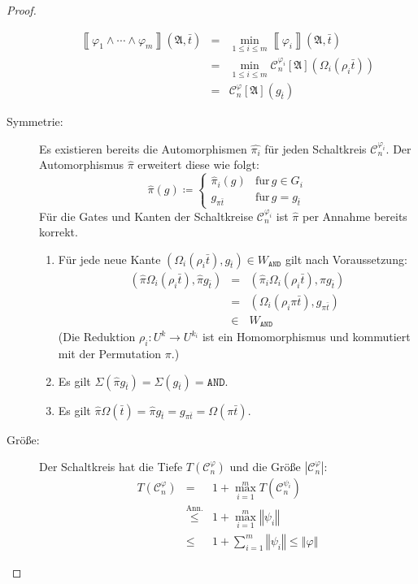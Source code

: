\begin{proof}
\begin{casenv}
\begin{description}
\begin{eqnarray*}
\left\llbracket \varphi_{1}\wedge\cdots\wedge\varphi_{m}\right\rrbracket \left(\mathfrak{A},\bar{t}\right) & = & \min_{1\leqslant i\leqslant m}\left\llbracket \varphi_{i}\right\rrbracket \left(\mathfrak{A},\bar{t}\right)\\
 & = & \min_{1\leqslant i\leqslant m}\mathcal{C}_{n}^{\varphi_{i}}\left[\mathfrak{A}\right]\left(\Omega_{i}\left(\rho_{i}\bar{t}\right)\right)\\
 & = & \mathcal{C}_{n}^{\varphi}\left[\mathfrak{A}\right]\left(g_{\bar{t}}\right)
\end{eqnarray*}
\item [{Symmetrie:}] Es existieren bereits die Automorphismen $\hat{\pi_{i}}$
für jeden Schaltkreis $\mathcal{C}_{n}^{\varphi_{i}}$. Der Automorphismus
$\hat{\pi}$ erweitert diese wie folgt:
\[
\hat{\pi}\left(g\right)\coloneqq\begin{cases}
\hat{\pi}_{i}\left(g\right) & \mathrm{f\ddot{u}r}\,g\in G_{i}\\
g_{\pi\bar{t}} & \mathrm{f\ddot{u}r}\,g=g_{\bar{t}}
\end{cases}
\]
Für die Gates und Kanten der Schaltkreise $\mathcal{C}_{n}^{\varphi_{i}}$
ist $\hat{\pi}$ per Annahme bereits korrekt.

\begin{enumerate}
\item Für jede neue Kante $\left(\Omega_{i}\left(\rho_{i}\bar{t}\right),g_{\bar{t}}\right)\in W_{\mathtt{AND}}$
gilt nach Voraussetzung: 
\begin{eqnarray*}
\left(\hat{\pi}\Omega_{i}\left(\rho_{i}\bar{t}\right),\hat{\pi}g_{\bar{t}}\right) & = & \left(\hat{\pi}_{i}\Omega_{i}\left(\rho_{i}\bar{t}\right),\hat{\pi}g_{\bar{t}}\right)\\
 & = & \left(\Omega_{i}\left(\rho_{i}\pi\bar{t}\right),g_{\pi\bar{t}}\right)\\
 & \in & W_{\mathtt{AND}}
\end{eqnarray*}
(Die Reduktion $\rho_{i}:U^{k}\rightarrow U^{k_{i}}$ ist ein Homomorphismus
und kommutiert mit der Permutation $\pi$.)
\item Es gilt $\Sigma\left(\hat{\pi}g_{\bar{t}}\right)=\Sigma\left(g_{\bar{t}}\right)=\mathtt{AND}$.
\item Es gilt $\hat{\pi}\Omega\left(\bar{t}\right)=\hat{\pi}g_{\bar{t}}=g_{\pi\bar{t}}=\Omega\left(\pi\bar{t}\right)$.
\end{enumerate}
\item [{Größe:}] Der Schaltkreis hat die Tiefe $T\left(\mathcal{C}_{n}^{\varphi}\right)$
und die Größe $\left|\mathcal{C}_{n}^{\varphi}\right|$: 
\begin{eqnarray*}
T\left(\mathcal{C}_{n}^{\varphi}\right) & = & 1+\max_{i=1}^{m}T\left(\mathcal{C}_{n}^{\psi_{i}}\right)\\
 & \overset{\mathrm{Ann.}}{\leqslant} & 1+\max_{i=1}^{m}\left\Vert \psi_{i}\right\Vert \\
 & \leqslant & 1+\sum_{i=1}^{m}\left\Vert \psi_{i}\right\Vert \leqslant\left\Vert \varphi\right\Vert 
\end{eqnarray*}
 

\end{description}
\end{casenv}
\end{proof}
